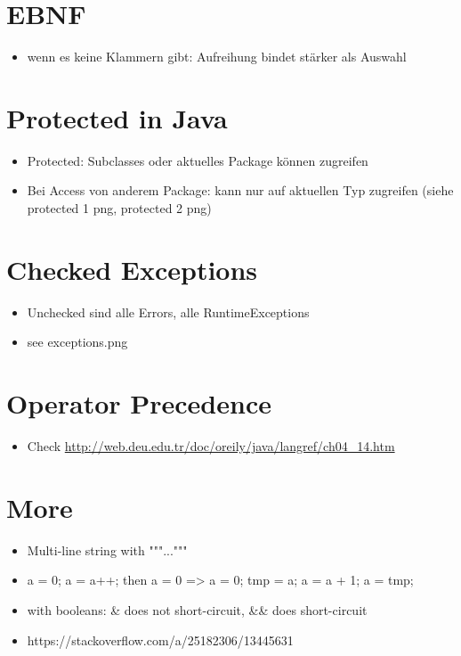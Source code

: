 \documentclass[UTF8]{article}
\begin{document}
\section{EBNF}

\begin{itemize}
    \item wenn es keine Klammern gibt: Aufreihung bindet stärker als Auswahl
\end{itemize}

\section{Protected in Java}

\begin{itemize}
    \item Protected: Subclasses oder aktuelles Package können zugreifen
    \item Bei Access von anderem Package: kann nur auf aktuellen Typ zugreifen (siehe protected 1 png, protected 2 png)
\end{itemize}


\section{Checked Exceptions}

\begin{itemize}
    \item Unchecked sind alle Errors, alle RuntimeExceptions
    \item see exceptions.png
\end{itemize}

\section{Operator Precedence}

\begin{itemize}
    \item Check \url{http://web.deu.edu.tr/doc/oreily/java/langref/ch04_14.htm}
\end{itemize}

\section{More}

\begin{itemize}
    \item Multi-line string with """..."""
    \item a = 0; a = a++; then a = 0 => a = 0; tmp = a; a = a + 1; a = tmp;
    \item with booleans: \& does not short-circuit, \&\& does short-circuit
    \item https://stackoverflow.com/a/25182306/13445631
\end{itemize}
\end{document}
